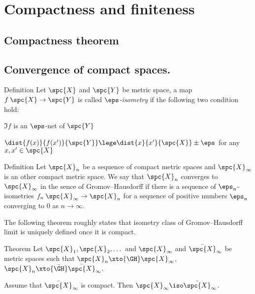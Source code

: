 \chapter{Compactness and finiteness}

\section{Compactness theorem}

\section{Convergence of compact spaces.}

\begin{thm}{Definition}
Let $\spc{X}$ and $\spc{Y}$ be metric space,
a map $f\:\spc{X}\to\spc{Y}$
is called \emph{$\eps$-isometry}
if the following two condition hold:
\begin{subthm}{}
$\Im f$ is an $\eps$-net of $\spc{Y}$
\end{subthm}

\begin{subthm}{}
$\dist{f(x)}{f(x')}{\spc{Y}}\lege\dist{x}{x'}{\spc{X}}\pm\eps$ for any $x,x'\in\spc{X}$
\end{subthm}

\end{thm}

\begin{thm}{Definition}
Let $\spc{X}_n$ be a sequence of compact metric spaces and $\spc{X}_\infty$ is an other compact metric space.
We say that $\spc{X}_n$ converges to $\spc{X}_\infty$ in the sence of Gromov--Hausdorff if there is a sequence of $\eps_n$-isometries 
$f_n\:\spc{X}_\infty\to \spc{X}_n$ for a sequence of positive numbers $\eps_n$ converging to $0$ as $n\to\infty$.
\end{thm}


The following theorem roughly states that isometry class of Gromov--Hausdorff limit is uniquely defined once it is compact. 

\begin{thm}{Theorem} Let $\spc{X}_1,\spc{X}_2,\dots$ and $\spc{X}_\infty$ and $\bar{\spc{X}}_\infty$ be metric spaces
such that $\spc{X}_n\xto{\GH}\spc{X}_\infty$, 
$\spc{X}_n\xto{\bar\GH}\bar{\spc{X}}_\infty$.

Assume that $\bar{\spc{X}}_\infty$ is compact.
Then $\spc{X}_\infty\iso \bar{\spc{X}}_\infty$.
\end{thm}


